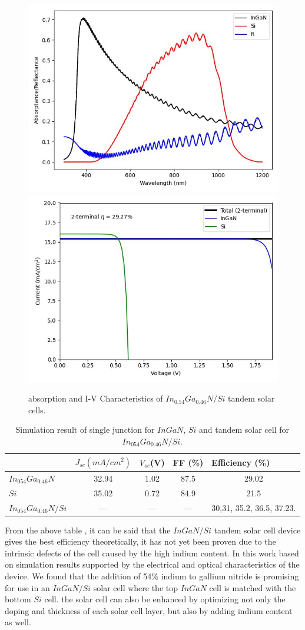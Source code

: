 \documentclass[preprint,12pt]{elsarticle}
\begin{document}
\begin{figure}[h!]
	\centering
	\includegraphics[width=0.45\linewidth, height=0.25\textheight]{Figure/Abs_Ref}
	\includegraphics[width=0.45\linewidth, height=0.25\textheight]{Figure/IV}
	\caption{absorption and I-V Characteristics of $In_{0.54}Ga_{0.46}N/Si$ tandem solar cells.}
	\label{fig:abs_iv}
\end{figure}

\begin{table}[h!]
	\begin{tabular}{@{}lcccc@{}}
		\toprule
		& \multicolumn{1}{l}{$J_{sc} (mA/cm^{2})$} & \multicolumn{1}{l}{$V_{oc}$(V)} & \multicolumn{1}{l}{FF (\%)} & 
	    \multicolumn{1}{l}{Efficiency (\%)} \\ \midrule
		$In_{054}Ga_{0.46}N$ & 32.94 & 1.02 & 87.5 & 29.02 \\
		$Si$ & 35.02 & 0.72 & 84.9 & 21.5 \\
		$In_{054}Ga_{0.46}N/Si$ & --- & --- & --- & 30,31\cite{bib14}, 35.2\cite{bib15}, 36.5\cite{bib16}, 37.23\cite{bib17}. 
		 \\ \bottomrule
	\end{tabular}
	\caption{Simulation result of single junction for $InGaN$, $Si$ and tandem solar cell for $In_{054}Ga_{0.46}N/Si$.}
	\label{tab:result}
\end{table}

% 

From the above table \pageref{tab:result}, it can be said that the $InGaN/Si$ tandem solar cell device gives the best efficiency theoretically, it has not yet been proven due to the intrinsic defects of the cell caused by the high indium content. In this work based on simulation results supported by the electrical and optical characteristics of the device. We found that the addition of 54\% indium to gallium nitride is promising for use in an $InGaN/Si$ solar cell where the top $InGaN$ cell is matched with the bottom $Si$ cell. the solar cell can also be enhanced by optimizing not only the doping and thickness of each solar cell layer, but also by adding indium content as well. 
\end{document}
